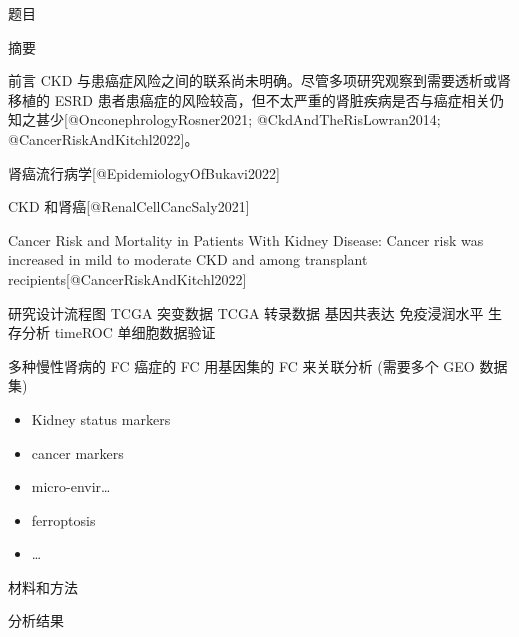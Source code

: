 \documentclass[
  ignorenonframetext,
]{beamer}
\author{}
\date{\vspace{-2.5em}}
\providecommand{\tightlist}{%
  \setlength{\itemsep}{0pt}\setlength{\parskip}{0pt}}
\begin{document}
\begin{frame}
\listoffigures

\listoftables
\end{frame}

\begin{frame}{题目}
\protect\hypertarget{ux9898ux76ee}{}
\end{frame}

\begin{frame}{摘要}
\protect\hypertarget{abstract}{}
\end{frame}

\begin{frame}{前言}
\protect\hypertarget{introduction}{}
CKD 与患癌症风险之间的联系尚未明确。尽管多项研究观察到需要透析或肾移植的
ESRD
患者患癌症的风险较高，但不太严重的肾脏疾病是否与癌症相关仍知之甚少{[}@OnconephrologyRosner2021;
@CkdAndTheRisLowran2014; @CancerRiskAndKitchl2022{]}。

肾癌流行病学{[}@EpidemiologyOfBukavi2022{]}

CKD 和肾癌{[}@RenalCellCancSaly2021{]}

Cancer Risk and Mortality in Patients With Kidney Disease: Cancer risk
was increased in mild to moderate CKD and among transplant
recipients{[}@CancerRiskAndKitchl2022{]}
\end{frame}

\begin{frame}{研究设计流程图}
\protect\hypertarget{route}{}
TCGA 突变数据 TCGA 转录数据 基因共表达 免疫浸润水平 生存分析 timeROC
单细胞数据验证

多种慢性肾病的 FC 癌症的 FC 用基因集的 FC 来关联分析 (需要多个 GEO
数据集)

\begin{itemize}
\tightlist
\item
  Kidney status markers
\item
  cancer markers
\item
  micro-envir\ldots{}
\item
  ferroptosis
\item
  \ldots{}
\end{itemize}
\end{frame}

\begin{frame}{材料和方法}
\protect\hypertarget{methods}{}
\end{frame}

\begin{frame}{分析结果}
\protect\hypertarget{results}{}
\end{frame}
\end{document}
